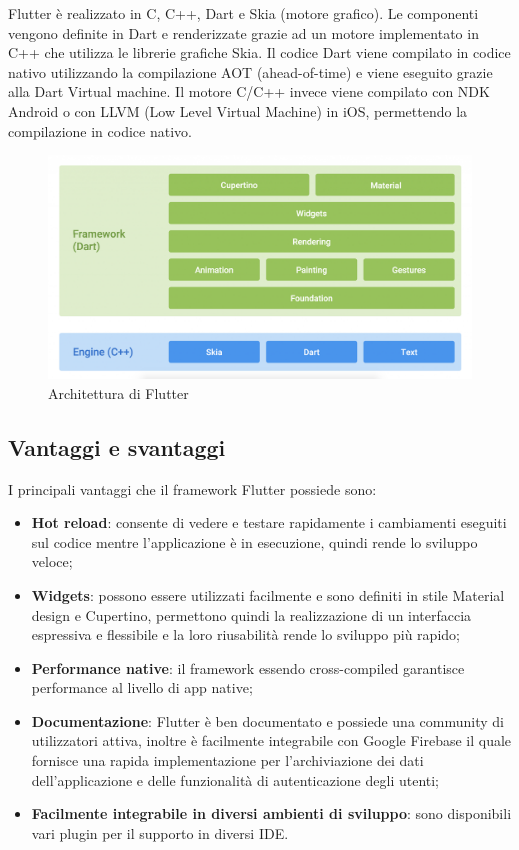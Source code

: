 Flutter è realizzato in C, C++, Dart e Skia (motore grafico). Le componenti vengono definite in Dart e renderizzate grazie ad un motore implementato in C++ che utilizza le librerie grafiche Skia. Il codice Dart viene compilato in codice nativo utilizzando la compilazione AOT (ahead-of-time) e viene eseguito grazie alla Dart Virtual machine. Il motore C/C++ invece viene compilato con NDK Android o con LLVM (Low Level Virtual Machine) in iOS, permettendo la compilazione in codice nativo.
\begin{figure}[H]
	\centering
	\captionsetup{justification=centering}
	\includegraphics[width=1\linewidth]{./immagini/flutter_architecture.png}
	\caption{Architettura di Flutter}
\end{figure}

\subsection{Vantaggi e svantaggi\label{sec:flutter-vantaggi}}
I principali vantaggi che il framework Flutter possiede sono:
\begin{itemize}
	\item \textbf{Hot reload}: consente di vedere e testare rapidamente i cambiamenti eseguiti sul codice mentre l'applicazione è in esecuzione, quindi rende lo sviluppo veloce;
	\item \textbf{Widgets}: possono essere utilizzati facilmente e sono definiti in stile Material design e Cupertino, permettono quindi la realizzazione di un interfaccia espressiva e flessibile e la loro riusabilità rende lo sviluppo più rapido; 
	\item \textbf{Performance native}: il framework essendo cross-compiled garantisce performance al livello di app native;
	\item \textbf{Documentazione}: Flutter è ben documentato e possiede una community di utilizzatori attiva, inoltre è facilmente integrabile con Google Firebase il quale fornisce una rapida implementazione per l'archiviazione dei dati dell'applicazione e delle funzionalità di autenticazione degli utenti;
	\item \textbf{Facilmente integrabile in diversi ambienti di sviluppo}: sono disponibili vari plugin per il supporto in diversi IDE.
\end{itemize}
